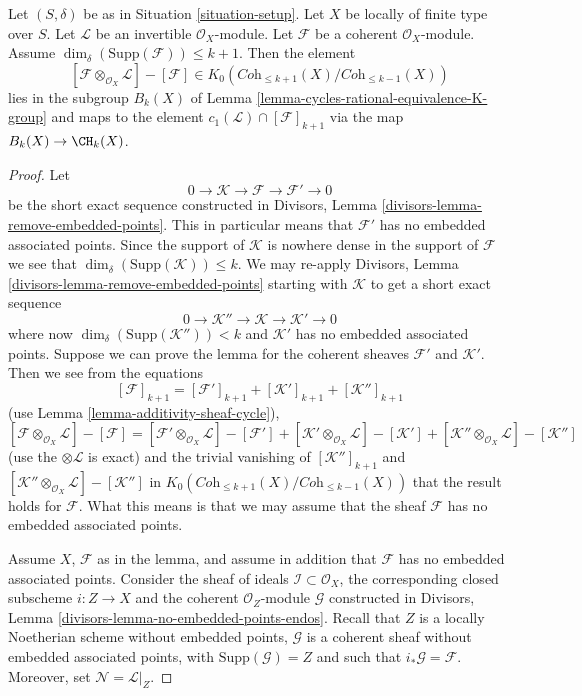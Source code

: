 \begin{lemma}
\label{lemma-coherent-sheaf-cap-c1}
Let $(S, \delta)$ be as in Situation \ref{situation-setup}.
Let $X$ be locally of finite type over $S$.
Let $\mathcal{L}$ be an invertible $\mathcal{O}_X$-module.
Let $\mathcal{F}$ be a coherent $\mathcal{O}_X$-module.
Assume $\dim_\delta(\text{Supp}(\mathcal{F})) \leq k + 1$.
Then the element
$$
[\mathcal{F} \otimes_{\mathcal{O}_X} \mathcal{L}]
-
[\mathcal{F}]
\in
K_0(\textit{Coh}_{\leq k + 1}(X)/\textit{Coh}_{\leq k - 1}(X))
$$
lies in the subgroup $B_k(X)$ of
Lemma \ref{lemma-cycles-rational-equivalence-K-group} and maps to
the element $c_1(\mathcal{L}) \cap [\mathcal{F}]_{k + 1}$ via
the map $B_k(X) \to \CH_k(X)$.
\end{lemma}

\begin{proof}
Let
$$
0 \to \mathcal{K} \to \mathcal{F} \to \mathcal{F}' \to 0
$$
be the short exact sequence constructed in
Divisors, Lemma \ref{divisors-lemma-remove-embedded-points}.
This in particular means that $\mathcal{F}'$ has no embedded
associated points.
Since the support of $\mathcal{K}$ is nowhere dense in the
support of $\mathcal{F}$ we see that
$\dim_\delta(\text{Supp}(\mathcal{K})) \leq k$. We may
re-apply
Divisors, Lemma \ref{divisors-lemma-remove-embedded-points}
starting with $\mathcal{K}$ to get a short exact sequence
$$
0 \to \mathcal{K}'' \to \mathcal{K} \to \mathcal{K}' \to 0
$$
where now $\dim_\delta(\text{Supp}(\mathcal{K}'')) < k$
and $\mathcal{K}'$ has no embedded associated points.
Suppose we can prove the lemma for the coherent sheaves
$\mathcal{F}'$ and $\mathcal{K}'$. Then we see
from the equations
$$
[\mathcal{F}]_{k + 1}
=
[\mathcal{F}']_{k + 1}
+ [\mathcal{K}']_{k + 1}
+ [\mathcal{K}'']_{k + 1}
$$
(use Lemma \ref{lemma-additivity-sheaf-cycle}),
$$
[\mathcal{F} \otimes_{\mathcal{O}_X} \mathcal{L}]
-
[\mathcal{F}]
=
[\mathcal{F}' \otimes_{\mathcal{O}_X} \mathcal{L}]
-
[\mathcal{F}']
+
[\mathcal{K}' \otimes_{\mathcal{O}_X} \mathcal{L}]
-
[\mathcal{K}']
+
[\mathcal{K}'' \otimes_{\mathcal{O}_X} \mathcal{L}]
-
[\mathcal{K}'']
$$
(use the $\otimes \mathcal{L}$ is exact)
and the trivial vanishing of $[\mathcal{K}'']_{k + 1}$ and
$[\mathcal{K}'' \otimes_{\mathcal{O}_X} \mathcal{L}]
- [\mathcal{K}'']$ in
$K_0(\textit{Coh}_{\leq k + 1}(X)/\textit{Coh}_{\leq k - 1}(X))$
that the result holds
for $\mathcal{F}$. What this means is that we may assume that
the sheaf $\mathcal{F}$ has no embedded associated points.

\medskip\noindent
Assume $X$, $\mathcal{F}$ as in the lemma, and assume in addition
that $\mathcal{F}$ has no embedded associated points. Consider the
sheaf of ideals $\mathcal{I} \subset \mathcal{O}_X$, the corresponding
closed subscheme $i : Z \to X$ and the coherent $\mathcal{O}_Z$-module
$\mathcal{G}$ constructed in
Divisors, Lemma \ref{divisors-lemma-no-embedded-points-endos}.
Recall that $Z$ is a locally Noetherian scheme without embedded points,
$\mathcal{G}$ is a coherent sheaf without embedded
associated points, with $\text{Supp}(\mathcal{G}) = Z$
and such that $i_*\mathcal{G} = \mathcal{F}$.
Moreover, set $\mathcal{N} = \mathcal{L}|_Z$.


\end{proof}
